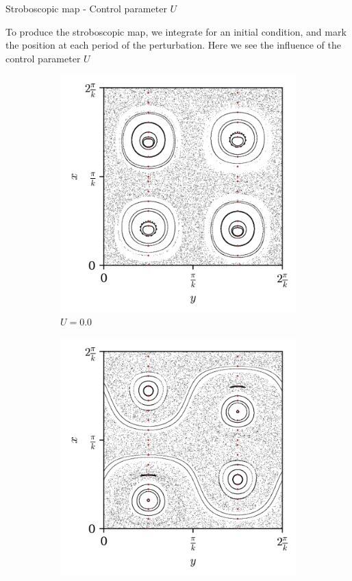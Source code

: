 \documentclass[10pt]{beamer}
\begin{document}
\begin{frame}{Stroboscopic map - Control parameter $U$}

To produce the stroboscopic map, we integrate for an initial condition, and mark the position at each period of the perturbation. Here we see the influence of the control parameter $U$


\begin{figure}[h]
    \centering
    \begin{subfigure}[b]{0.3\textwidth}
        \includegraphics[width=\textwidth]{graf_2ondas/map2_data-map_U_p0.0000.png}
        \caption{$U = 0.0$}
    \end{subfigure}
    \begin{subfigure}[b]{0.3\textwidth}
        \includegraphics[width=\textwidth]{graf_2ondas/map2_data-map_U_p0.4000.png}

\end{subfigure}
\end{figure}
\end{frame}
\end{document}
